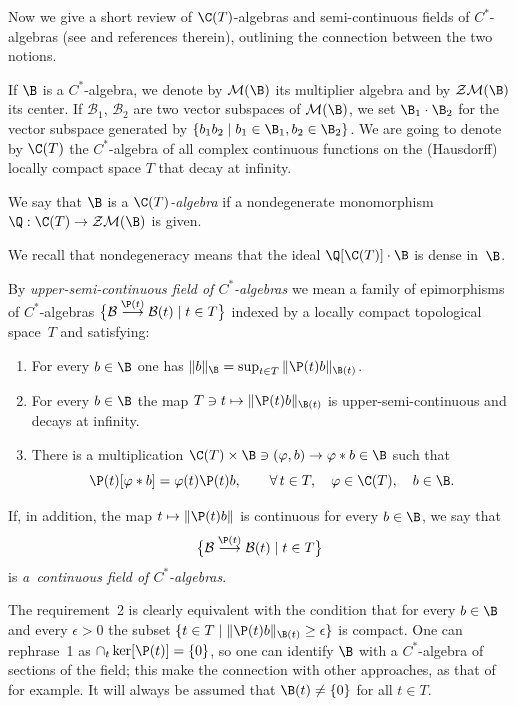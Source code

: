 Now we give a short review of $\C(T)$-algebras and semi-continuous f\/ields of $C^*$-algebras
(see \cite{Bl,La,Lee,Ni,Rie,Wi} and references therein), outlining the connection between the two notions.

If $\B$ is a $C^*$-algebra, we denote by $\mathcal M(\B)$ its multiplier algebra and by $\mathcal Z\mathcal M(\B)$ its center.
If $\mathcal B_1$, $\mathcal B_2$ are two vector subspaces of $\mathcal M(\B)$, we set $\B_1\cdot\B_2$ for the vector
subspace generated by $\{b_1 b_2\mid b_1\in\B_1,b_2\in\B_2\}$.
We are going to denote by $\C(T)$ the $C^*$-algebra of all complex continuous functions on the (Hausdorf\/f)
locally compact space $T$ that decay at inf\/inity.

\begin{Definition}\label{cedete}
We say that $\B$ is a {\it $\C(T)$-algebra}
if a nondegenerate monomorphism $\Q:\C(T)\rightarrow\mathcal Z\mathcal M(\B)$ is given.
\end{Definition}

We recall that nondegeneracy means that the ideal $\Q[\C(T)]\cdot\B$
is dense in~$\B$.

\begin{Definition}\label{niulaif}
By {\it upper-semi-continuous field of $C^*$-algebras} we mean a family of epimorphisms of $C^*$-algebras
$\big\{\mathcal B\overset{\P(t)}{\longrightarrow}\mathcal B(t)\mid t\in T\big\}$
indexed by a locally compact topological space~$T$ and satisfying:
\begin{enumerate}\itemsep=0pt
\item
For every $b\in\B$ one has $\| b\|_\B=\sup_{t\in T}\| \P(t)b\|_{\B(t)}$.
\item
For every $b\in\B$ the map
$T\ni t\mapsto\| \P(t)b\|_{\B(t)}$ is upper-semi-continuous and decays at inf\/inity.
\item
There is a multiplication $\C(T)\times\B\ni(\varphi,b)\rightarrow\varphi\ast b\in\B$ such that
\[
\P(t)[\varphi\ast b]=\varphi(t) \P(t)b ,\qquad \forall\,t\in T,\quad \varphi\in\C(T) ,\quad  b\in\B .
\]
\end{enumerate}
If, in addition, the map $t\mapsto\| \P(t)b\| $ is continuous for every $b\in \B$, we say that
\[
\big\{\mathcal B\overset{\P(t)}{\longrightarrow}\mathcal B(t)\mid t\in T\big\}
\] is {\it a~continuous field of
$C^*$-algebras}.
\end{Definition}

The requirement~2 is clearly equivalent with the condition that
for every $b\in\B$ and every $\epsilon>0$ the subset $\{t\in T\mid\| \P(t)b\|_{\B(t)}\ge \epsilon\}$  is compact.
One can rephrase~1 as $\cap_t\ker[\P(t)]=\{0\}$,
so one can identify $\B$ with a $C^*$-algebra of sections of the f\/ield; this make the connection with other approaches,
as that of~\cite{Ni} for example. It will always be assumed that $\B(t)\ne\{0\}$ for all $t\in T$.

